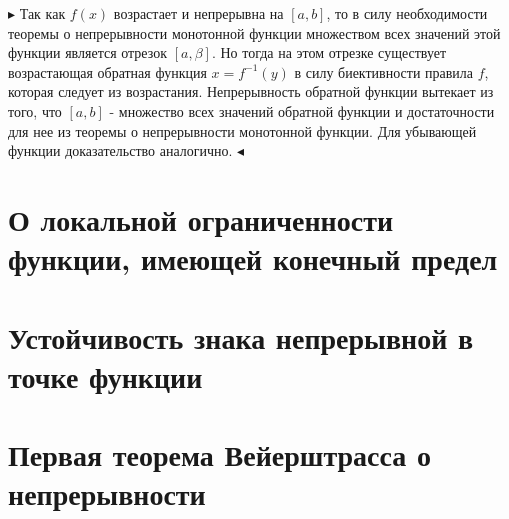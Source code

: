 \documentclass[14pt]{article}
\begin{document}
        $\blacktriangleright$ 
        Так как $f(x)$ возрастает и непрерывна на $[a,b]$, то в силу необходимости теоремы о непрерывности монотонной функции множеством всех значений этой функции является отрезок $[a, \beta]$. Но тогда на этом отрезке существует возрастающая обратная функция $x=f^{-1}(y)$ в силу биективности правила $f$, которая следует из возрастания. Непрерывность обратной функции вытекает из того, что $[a,b]$ - множество всех значений обратной функции и достаточности для нее из теоремы о непрерывности монотонной функции. Для убывающей функции доказательство аналогично.  
        $\blacktriangleleft$\\
    \section{О локальной ограниченности функции, имеющей конечный предел}

    \section{Устойчивость знака непрерывной в точке функции}

    \section{Первая теорема Вейерштрасса о непрерывности}

\end{document}
